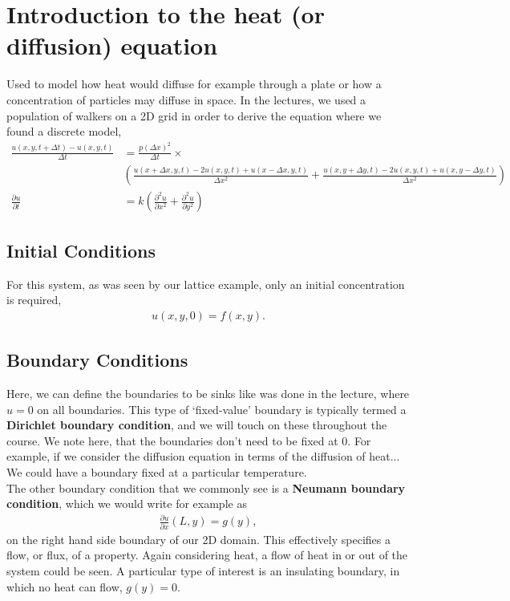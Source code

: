\documentclass[11pt,a4paper]{report}
\theoremstyle{definition}
\begin{document}
\section{Introduction to the heat (or diffusion) equation}
Used to model how heat would diffuse for example through a plate or how a concentration of particles may diffuse in space. In the lectures, we used a population of walkers on a 2D grid in order to derive the equation where we found a discrete model,
\begin{align*}
	\frac{u(x,y,t+\Delta t) - u(x,y,t)}{\Delta t} &= \frac{p(\Delta x)^2}{\Delta t} \times \\ &\left(\frac{u(x+\Delta x,y,t) - 2u(x,y,t) + u(x-\Delta x,y,t)}{\Delta x^2} + \frac{u(x,y+\Delta y,t) - 2u(x,y,t) + u(x,y-\Delta y,t)}{\Delta x^2}\right) \\
	\frac{\partial u}{\partial t} &= k\left(\frac{\partial^2 u}{\partial x^2} + \frac{\partial^2 u}{\partial y^2}\right)
\end{align*}

\subsection{Initial Conditions}
For this system, as was seen by our lattice example, only an initial concentration is required,
\begin{align*}
	u(x,y,0) = f(x,y).
\end{align*}

\subsection{Boundary Conditions}
Here, we can define the boundaries to be sinks like was done in the lecture, where $u=0$ on all boundaries. This type of `fixed-value' boundary is typically termed a \textbf{Dirichlet boundary condition}, and we will touch on these throughout the course. We note here, that the boundaries don't need to be fixed at 0. For example, if we consider the diffusion equation in terms of the diffusion of heat... We could have a boundary fixed at a particular temperature. \\

The other boundary condition that we commonly see is a \textbf{Neumann boundary condition}, which we would write for example as
\begin{align*}
	\frac{\partial u}{\partial x} (L,y) = g(y),
\end{align*}
on the right hand side boundary of our 2D domain. This effectively specifies a flow, or flux, of a property. Again considering heat, a flow of heat in or out of the system could be seen. A particular type of interest is an insulating boundary, in which no heat can flow, $g(y)=0$.
\end{document}
